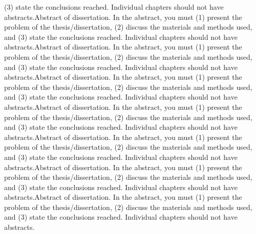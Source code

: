 \begin{titlepage}
\begin{flushleft}
(3) state the conclusions reached. Individual chapters should not have abstracts.Abstract of dissertation. In the abstract, you must (1) present the problem of the thesis/dissertation, (2) discuss the materials and methods used, and (3) state the conclusions reached. Individual chapters should not have abstracts.Abstract of dissertation. In the abstract, you must (1) present the problem of the thesis/dissertation, (2) discuss the materials and methods used, and (3) state the conclusions reached. Individual chapters should not have abstracts.Abstract of dissertation. In the abstract, you must (1) present the problem of the thesis/dissertation, (2) discuss the materials and methods used, and (3) state the conclusions reached. Individual chapters should not have abstracts.Abstract of dissertation. In the abstract, you must (1) present the problem of the thesis/dissertation, (2) discuss the materials and methods used, and (3) state the conclusions reached. Individual chapters should not have abstracts.Abstract of dissertation. In the abstract, you must (1) present the problem of the thesis/dissertation, (2) discuss the materials and methods used, and (3) state the conclusions reached. Individual chapters should not have abstracts.Abstract of dissertation. In the abstract, you must (1) present the problem of the thesis/dissertation, (2) discuss the materials and methods used, and (3) state the conclusions reached. Individual chapters should not have abstracts.Abstract of dissertation. In the abstract, you must (1) present the problem of the thesis/dissertation, (2) discuss the materials and methods used, and (3) state the conclusions reached. Individual chapters should not have abstracts.

\end{flushleft}
\vspace*{\fill}
\end{titlepage}
